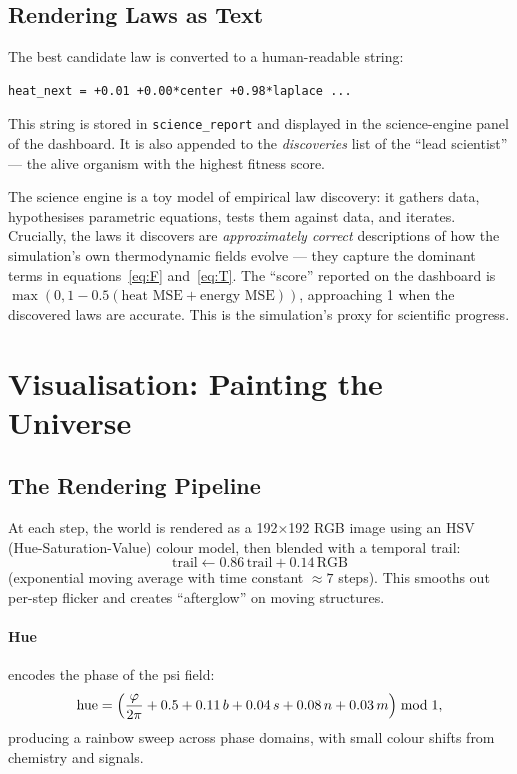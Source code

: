 \documentclass[12pt,a4paper]{article}
\begin{document}
\subsection{Rendering Laws as Text}

The best candidate law is converted to a human-readable string:
\begin{verbatim}
heat_next = +0.01 +0.00*center +0.98*laplace ...
\end{verbatim}
This string is stored in \texttt{science\_report} and displayed
in the science-engine panel of the dashboard.
It is also appended to the \emph{discoveries} list of the
``lead scientist'' — the alive organism with the highest
fitness score.

\begin{tcolorbox}[keybox={Significance of the science engine}]
The science engine is a toy model of empirical law discovery:
it gathers data, hypothesises parametric equations,
tests them against data, and iterates.
Crucially, the laws it discovers are \emph{approximately correct}
descriptions of how the simulation's own thermodynamic fields evolve —
they capture the dominant terms in equations~\eqref{eq:F}
and~\eqref{eq:T}.
The ``score'' reported on the dashboard is
$\max(0, 1 - 0.5(\text{heat MSE} + \text{energy MSE}))$,
approaching 1 when the discovered laws are accurate.
This is the simulation's proxy for scientific progress.
\end{tcolorbox}

\section{Visualisation: Painting the Universe}

\subsection{The Rendering Pipeline}

At each step, the world is rendered as a 192×192 RGB image
using an HSV (Hue-Saturation-Value) colour model,
then blended with a temporal trail:
\[
  \text{trail} \leftarrow 0.86\,\text{trail} + 0.14\,\text{RGB}
\]
(exponential moving average with time constant $\approx 7$ steps).
This smooths out per-step flicker and creates ``afterglow'' on
moving structures.

\paragraph{Hue} encodes the phase of the psi field:
\[
  \text{hue} = \Bigl(\frac{\varphi}{2\pi} + 0.5 + 0.11\,b
    + 0.04\,s + 0.08\,n + 0.03\,m\Bigr) \bmod 1,
\]
producing a rainbow sweep across phase domains,
with small colour shifts from chemistry and signals.
\end{document}
